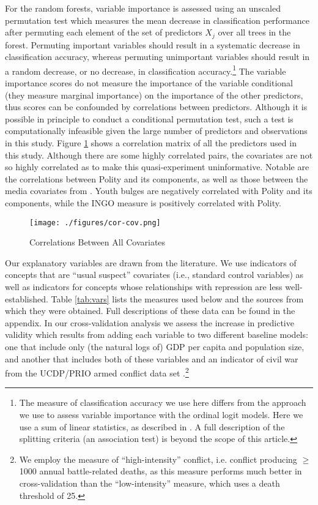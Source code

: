 \documentclass[12pt]{article}
\begin{document}
For the random forests, variable importance is assessed using an unscaled permutation test which measures the mean decrease in classification performance after permuting each element of the set of predictors $X_j$ over all trees in the forest. Permuting important variables should result in a systematic decrease in classification accuracy, whereas permuting unimportant variables should result in a random decrease, or no decrease, in classification accuracy.\footnote{The measure of classification accuracy we use here differs from the approach we use to assess variable importance with the ordinal logit models. Here we use a sum of linear statistics, as described in \citet{hothorn2006unbiased}. A full description of the splitting criteria (an association test) is beyond the scope of this article.} The variable importance scores do not measure the importance of the variable conditional (they measure marginal importance) on the importance of the other predictors, thus scores can be confounded by correlations between predictors. Although it is possible in principle to conduct a conditional permutation test, such a test is computationally infeasible given the large number of predictors and observations in this study. Figure \ref{fig:cor-cov} shows a correlation matrix of all the predictors used in this study. Although there are some highly correlated pairs, the covariates are not so highly correlated as to make this quasi-experiment uninformative. Notable are the correlations between Polity and its components, as well as those between the media covariates from \citet{RonRamosRodgers2005}. Youth bulges are negatively correlated with Polity and its components, while the INGO measure is positively correlated with Polity. 

\begin{figure}[!htpb]
\texttt{[image: ./figures/cor-cov.png]}
\caption{Correlations Between All Covariates} 
\label{fig:cor-cov}
\end{figure}

Our explanatory variables are drawn from the literature. We use indicators of concepts that are ``usual suspect'' covariates (i.e., standard control variables) as well as indicators for concepts whose relationships with repression are less well-established. Table \ref{tab:vars} lists the measures used below and the sources from which they were obtained. Full descriptions of these data can be found in the appendix. In our cross-validation analysis we assess the increase in predictive validity which results from adding each variable to two different baseline models: one that include only (the natural logs of) GDP per capita and population size, and another that includes both of these variables and an indicator of civil war from the UCDP/PRIO armed conflict data set \citep{ThemnerWallensteen2012}.\footnote{We employ the measure of ``high-intensity'' conflict, i.e. conflict producing $\geq$ 1000 annual battle-related deaths, as this measure performs much better in cross-validation than the ``low-intensity'' measure, which uses a death threshold of 25.}
\end{document}
